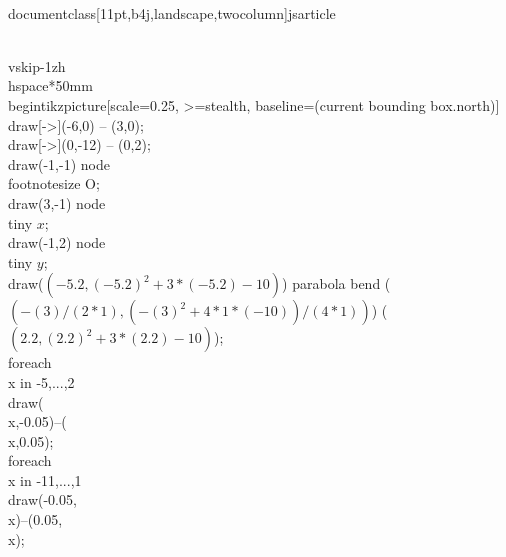 \\documentclass[11pt,b4j,landscape,twocolumn]{jsarticle}
\begin{document}
\\vskip-1zh
\\hspace*{50mm}
\\begin{tikzpicture}[scale=0.25, >=stealth, baseline=(current bounding box.north)]
\\draw[->](-6,0) -- (3,0);
\\draw[->](0,-12) -- (0,2);
\\draw(-1,-1) node {\\footnotesize O};
\\draw(3,-1) node {\\tiny $x$};
\\draw(-1,2) node {\\tiny $y$};
\\draw($ (-5.2,{(-5.2)^2+3*(-5.2)-10}) $) parabola bend ($ ({-(3)/(2*1)},{(-(3)^2+4*1*(-10))/(4*1)}) $) ($ (2.2,{(2.2)^2+3*(2.2)-10}) $);
\\foreach \\x in {-5,...,2}{\\draw(\\x,-0.05)--(\\x,0.05);}
\\foreach \\x in {-11,...,1}{\\draw(-0.05,\\x)--(0.05,\\x);}
\end{document}

